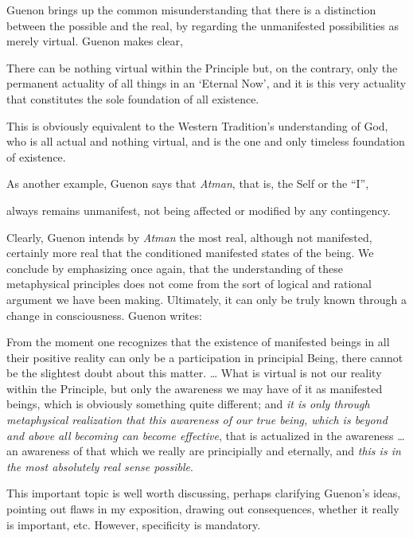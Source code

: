 Guenon brings up the common misunderstanding that there is a distinction between the possible and the real, by regarding the unmanifested possibilities as merely virtual. Guenon makes clear,

\begin{quotex}
There can be nothing virtual within the Principle but, on the contrary, only the permanent actuality of all things in an ‘Eternal Now', and it is this very actuality that constitutes the sole foundation of all existence.

\end{quotex}
This is obviously equivalent to the Western Tradition's understanding of God, who is all actual and nothing virtual, and is the one and only timeless foundation of existence.

As another example, Guenon says that \emph{Atman}, that is, the Self or the “I”,

\begin{quotex}
always remains unmanifest, not being affected or modified by any contingency. 

\end{quotex}
Clearly, Guenon intends by \emph{Atman} the most real, although not manifested, certainly more real that the conditioned manifested states of the being. We conclude by emphasizing once again, that the understanding of these metaphysical principles does not come from the sort of logical and rational argument we have been making. Ultimately, it can only be truly known through a change in consciousness. Guenon writes:

\begin{quotex}
From the moment one recognizes that the existence of manifested beings in all their positive reality can only be a participation in principial Being, there cannot be the slightest doubt about this matter. … What is virtual is not our reality within the Principle, but only the awareness we may have of it as manifested beings, which is obviously something quite different; and \emph{it is only through metaphysical realization that this awareness of our true being, which is beyond and above all becoming can become effective}, that is actualized in the awareness … an awareness of that which we really are principially and eternally, and \emph{this is in the most absolutely real sense possible}. 

\end{quotex}

This important topic is well worth discussing, perhaps clarifying Guenon's ideas, pointing out flaws in my exposition, drawing out consequences, whether it really is important, etc. However, specificity is mandatory.

